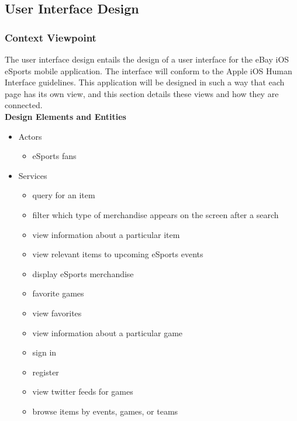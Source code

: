 \documentclass[onecolumn, draftclsnofoot,10pt, compsoc]{IEEEtran}
\begin{document}
\subsection{User Interface Design}

\subsubsection{Context Viewpoint}
    The user interface design entails the design of a user interface for the eBay iOS eSports mobile application. The interface will conform to the Apple iOS Human Interface guidelines. This application will be designed in such a way that each page has its own view, and this section details these views and how they are connected.\\
     \indent\textbf{Design Elements and Entities}
     \begin{itemize}
     \item Actors
       \begin{itemize}
       \item eSports fans 
        \end{itemize}
       
     \item Services
      \begin{itemize}
      \item query for an item
      \item filter which type of merchandise appears on the screen after a search 
      \item view information about a particular item 
      \item view relevant items to upcoming eSports events
      \item display eSports merchandise
      \item favorite games
      \item view favorites
      \item view information about a particular game 
      \item sign in
      \item register 
      \item view twitter feeds for games
      \item browse items by events, games, or teams
       \end{itemize}
       \end{itemize}
       
\end{document}
